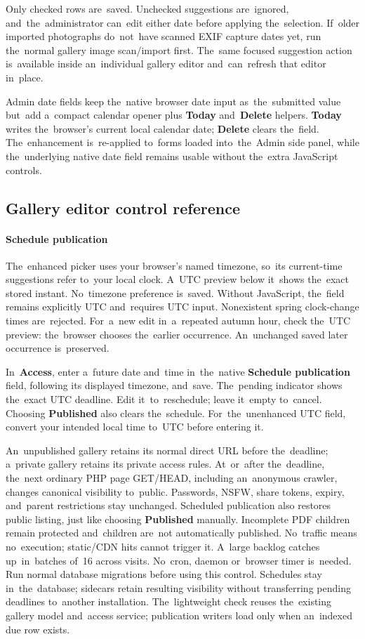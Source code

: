 \documentclass[11pt,a4paper]{article}
\newcommand{\ui}[1]{\textbf{#1}}
\begin{document}
Only checked rows are~saved. Unchecked suggestions are~ignored,
and~the~administrator can~edit either date before applying the~selection.
If~older imported photographs do~not~have scanned EXIF capture dates yet, run
the~normal gallery image scan/import first. The~same focused suggestion action
is~available inside an~individual gallery editor and~can~refresh that editor
in~place.

Admin date fields keep the~native browser date input as~the~submitted value
but~add a~compact calendar opener plus \ui{Today} and~\ui{Delete} helpers.
\ui{Today} writes the~browser's current local calendar date; \ui{Delete} clears
the~field. The~enhancement is~re-applied to~forms loaded into~the~Admin side
panel, while the~underlying native date field remains usable without the~extra
JavaScript controls.

\subsection{Gallery editor control reference}
\paragraph{Schedule publication}
The~enhanced picker uses your browser's named timezone, so~its current-time
suggestions refer to~your local clock. A~UTC preview below it~shows the~exact
stored instant. No~timezone preference is~saved. Without JavaScript,
the~field remains explicitly UTC and~requires UTC input.
Nonexistent spring clock-change times are~rejected. For~a~new edit
in~a~repeated autumn hour, check the~UTC preview: the~browser chooses
the~earlier occurrence. An~unchanged saved later occurrence is~preserved.

In~\ui{Access}, enter a~future date and~time in~the~native
\ui{Schedule publication} field, following its displayed timezone, and~save.
The~pending indicator shows the~exact UTC deadline. Edit it~to~reschedule;
leave it~empty to~cancel. Choosing \ui{Published} also clears the~schedule.
For~the~unenhanced UTC field, convert your intended local time to~UTC
before entering it.

An~unpublished gallery retains its normal direct URL before the~deadline;
a~private gallery retains its private access rules. At~or~after the~deadline,
the~next ordinary PHP page GET/HEAD, including an~anonymous crawler, changes
canonical visibility to~public. Passwords, NSFW, share tokens, expiry,
and~parent restrictions stay unchanged. Scheduled publication also restores
public listing, just like choosing \ui{Published} manually.
Incomplete PDF children remain protected and~children are~not automatically
published. No~traffic means no~execution; static/CDN hits cannot trigger it.
A~large backlog catches up~in~batches of~16 across visits. No~cron, daemon
or~browser timer is~needed. Run normal database migrations before using this
control. Schedules stay in~the~database; sidecars retain resulting visibility
without transferring pending deadlines to~another installation.
The~lightweight check reuses the~existing gallery model and~access service;
publication writers load only when an~indexed due row exists.
\end{document}

